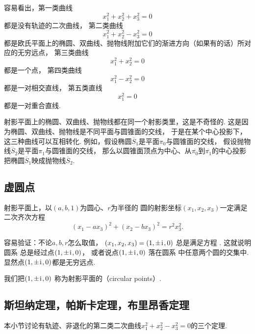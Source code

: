 容易看出，第一类曲线\begin{equation*}
	x_1^2 + x_2^2 + x_3^2 = 0
\end{equation*}
都是没有轨迹的二次曲线，
第二类曲线\begin{equation*}
	x_1^2 + x_2^2 - x_3^2 = 0
\end{equation*}
都是欧氏平面上的椭圆、双曲线、抛物线附加它们的渐进方向（如果有的话）所对应的无穷远点，
第三类曲线\begin{equation*}
	x_1^2 + x_2^2 = 0
\end{equation*}
都是一个点，
第四类曲线\begin{equation*}
	x_1^2 - x_2^2 = 0
\end{equation*}
都是一对相交直线，
第五类直线\begin{equation*}
	x_1^2 = 0
\end{equation*}
都是一对重合直线.

射影平面上的椭圆、双曲线、抛物线都在同一个射影类里，这是不奇怪的.
这是因为椭圆、双曲线、抛物线是不同平面与圆锥面的交线，
于是在某个中心投影下，这三种曲线可以互相转化.
例如，假设椭圆\(\overline{S}_1\)是平面\(\pi_0\)与圆锥面的交线，
假设抛物线\(\overline{S}_2\)是平面\(\pi_1\)与圆锥面的交线，
那么以圆锥面顶点为中心、从\(\overline{\pi_0}\)到\(\overline{\pi_1}\)的中心投影
把椭圆\(\overline{S}_1\)映成抛物线\(\overline{S}_2\).

\subsection{虚圆点}
射影平面上，以\((a,b,1)\)为圆心、\(r\)为半径的
圆的射影坐标\((x_1,x_2,x_3)\)一定满足
二次齐次方程\begin{equation}\label{equation:配极.圆的齐次射影坐标方程}
	(x_1 - a x_3)^2 + (x_2 - b x_3)^2 = r^2 x_3^2.
\end{equation}

容易验证：不论\(a,b,r\)怎么取值，
\((x_1,x_2,x_3) = (1,\pm\kern1pt\mathrm{i}\kern1pt,0)\)
总是满足方程 .
这就说明圆系 
总是经过点\((1,\pm\kern1pt\mathrm{i}\kern1pt,0)\)，
或者说点\((1,\pm\kern1pt\mathrm{i}\kern1pt,0)\)
落在圆系  中任意两个圆的交集中.
显然点\((1,\pm\kern1pt\mathrm{i}\kern1pt,0)\)都是无穷远点.

我们把\((1,\pm\kern1pt\mathrm{i}\kern1pt,0)\)
称为射影平面的（circular points）.

\subsection{斯坦纳定理，帕斯卡定理，布里昂香定理}
本小节讨论有轨迹、非退化的第二类二次曲线\(
	x_1^2 + x_2^2 - x_3^2 = 0
\)的三个定理.

